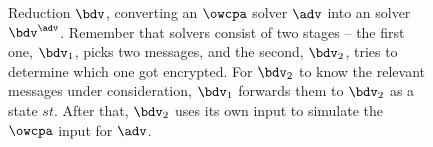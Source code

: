     \begin{figure}[h]
    	\begin{center}
    	\end{center}
    	\caption{
    		\label{fig:ind-ow-red}
    		Reduction $\bdv$, converting an $\owcpa$ solver $\adv$ into an \indcpa solver $\bdv^{\adv}$.
    		Remember that \indcpa solvers consist of two stages --
    		the first one, $\bdv_1$, picks two messages,
    		and the second, $\bdv_2$, tries to determine which one got encrypted.
    		For $\bdv_2$ to know the relevant messages under consideration,
    		$\bdv_1$ forwards them to $\bdv_2$ as a state $st$.
    		After that, $\bdv_2$ uses its own input to simulate the $\owcpa$ input for $\adv$.
    	}
    \end{figure}


